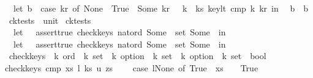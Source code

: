 \begin{isabellebody}
\ \ let\ b{}\ {\isacharequal}\ {\isacharparenleft}case\ kr\ of\ None\ {\isacharequal}{\isachargreater}\ True\ {\isacharbar}\ Some\ kr\ {\isacharequal}{\isachargreater}\ {\isacharparenleft}{\isacharbang}\ k\ {\isacharcolon}\ ks{\isachardot}\ key{\isacharunderscore}lt\ cmp\ k\ kr{\isacharparenright}{\isacharparenright}\ in\isanewline
\ \ b{}\ {\isacharampersand}\ b{}{\isacharparenright}{\isachardoublequoteclose}\isanewline
\isanewline
{}\isamarkupfalse%
\ ck{\isacharunderscore}tests\ {\isacharcolon}{\isacharcolon}\ unit\ \isanewline
{\isachardoublequoteopen}ck{\isacharunderscore}tests\ {\isacharequal}\ {\isacharparenleft}\isanewline
\ \ let\ {\isacharunderscore}\ {\isacharequal}\ assert{\isacharunderscore}true\ {\isacharparenleft}check{\isacharunderscore}keys\ nat{\isacharunderscore}ord\ {\isacharparenleft}Some\ {}{\isacharparenright}\ {\isacharparenleft}set{\isacharbrackleft}{}{\isacharcomma}{}{\isacharcomma}{}{\isacharbrackright}{\isacharparenright}\ {\isacharparenleft}Some\ {}{\isacharparenright}{\isacharparenright}\ in\isanewline
\ \ let\ {\isacharunderscore}\ {\isacharequal}\ assert{\isacharunderscore}true\ {\isacharparenleft}{\isachartilde}{\isacharparenleft}check{\isacharunderscore}keys\ nat{\isacharunderscore}ord\ {\isacharparenleft}Some\ {}{\isacharparenright}\ {\isacharparenleft}set{\isacharbrackleft}{}{\isacharcomma}{}{\isacharcomma}{}{\isacharbrackright}{\isacharparenright}\ {\isacharparenleft}Some\ {}{\isacharparenright}{\isacharparenright}{\isacharparenright}\ in\isanewline
\ \ {\isacharparenleft}{\isacharparenright}{\isacharparenright}{\isachardoublequoteclose}\isanewline
\isanewline
\isanewline
\isanewline
{}\isamarkupfalse%
\ check{\isacharunderscore}keys{\isacharunderscore}{}\ {\isacharcolon}{\isacharcolon}\ {\isachardoublequoteopen}{\isacharprime}k\ ord\ {\isasymRightarrow}\ {\isacharprime}k\ set\ {\isasymRightarrow}\ {\isacharprime}k\ option\ {\isasymRightarrow}\ {\isacharprime}k\ set\ {\isasymRightarrow}\ {\isacharprime}k\ option\ {\isasymRightarrow}\ {\isacharprime}k\ set\ {\isasymRightarrow}\ bool{\isachardoublequoteclose}\ \isanewline
{\isachardoublequoteopen}check{\isacharunderscore}keys{\isacharunderscore}{}\ cmp\ xs\ l\ ks\ u\ zs\ {\isacharequal}\ {\isacharparenleft}\isanewline
\ \ {\isacharparenleft}case\ l{\isacharequal}None\ of\ True\ {\isasymRightarrow}\ xs{\isacharequal}{\isacharbraceleft}{\isacharbraceright}\ {\isacharbar}\ {\isacharunderscore}\ {\isasymRightarrow}\ True{\isacharparenright}\ {\isacharampersand}\isanewline

\end{isabellebody}
